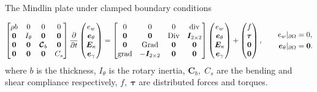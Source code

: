 \documentclass[aspectratio=169]{ISAE-Beamer}
\DeclareMathOperator*{\grad}{grad}
\DeclareMathOperator*{\Grad}{Grad}
\DeclareMathOperator*{\Div}{Div}
\renewcommand{\div}{\operatorname{div}}
\begin{document}
\begin{frame}{The Mindlin plate under clamped boundary conditions}

\begin{equation*}
	\begin{bmatrix}
	\rho b  & 0  & 0  & 0 \\
	\bm{0} & I_\theta &  \bm{0} & \bm{0}\\
	\bm{0}  & \bm{0}  & \bm{\mathcal{C}}_b  & \bm{0}\\
	\bm{0} & \bm{0} &  \bm{0} & C_s \\
	\end{bmatrix}
	\diffp{}{t}
	\begin{pmatrix}
	e_w \\
	\bm{e}_\theta \\
	\bm{E}_\kappa \\
	\bm{e}_{\gamma} \\
	\end{pmatrix} = 
	\begin{bmatrix}
	0  & 0  & 0  & \div \\
	\bm{0} & \bm{0} &  \Div & \bm{I}_{2 \times 2}\\
	\bm{0}  & \Grad  & \bm{0}  & \bm{0}\\
	\grad & -\bm{I}_{2 \times 2} &  \bm{0} & \bm{0} \\
	\end{bmatrix}
	\begin{pmatrix}
	e_w \\
	\bm{e}_{\theta} \\
	\bm{E}_{\kappa} \\
	\bm{e}_{\gamma} \\
	\end{pmatrix} + 
	\begin{pmatrix}
	f \\
	\bm{\tau} \\
	\bm{0} \\
	\bm{0} \\
	\end{pmatrix}, \qquad
	\begin{aligned}
	{e}_w\vert_{\partial\Omega} &= 0, \\
	\bm{e}_\theta\vert_{\partial\Omega} &= \bm{0}.
	\end{aligned}	
\end{equation*}
where $b$ is the thickness, $I_\theta$ is the rotary inertia, $\bm{C}_b, \; C_s$ are the bending and shear compliance  respectively, $f, \; \bm{\tau}$ are distributed forces and torques.
\vspace{.5cm}


\end{frame}
\end{document}

